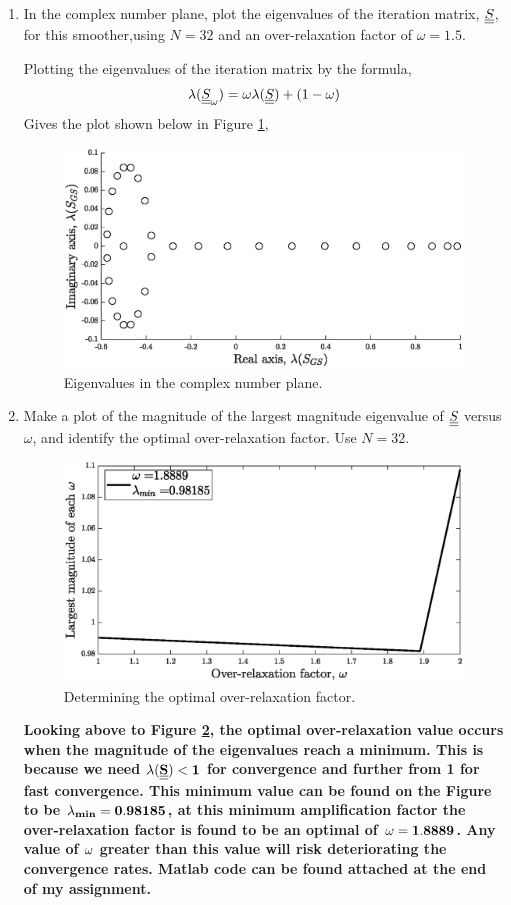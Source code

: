 \begin{enumerate}[label=\alph*., start = 1]
    \pagebreak
    \item In the complex number plane, plot the eigenvalues of the iteration matrix, $\underline{\underline{S}}$, for this smoother,using $N= 32$ and an over-relaxation factor of $\omega = 1.5$.
    
    Plotting the eigenvalues of the iteration matrix by the formula,
    \begin{equation*}
        \lambda(\underline{\underline{S}}_\omega) = \omega\lambda(\underline{\underline{S}}) + (1 - \omega)
    \end{equation*}
    Gives the plot shown below in Figure \ref{fig:q3b},
    \begin{figure}[h]
        \centering
        \includegraphics[width = 0.6\linewidth]{q3/q3_eigens.eps}
        \caption{Eigenvalues in the complex number plane.}
        \label{fig:q3b}
    \end{figure}

    
    \item Make a plot of the magnitude of the largest magnitude eigenvalue of $\underline{\underline{S}}$ versus $\omega$, and identify the optimal over-relaxation factor. Use $N= 32$.
    
    \begin{figure}[h]
        \centering
        \includegraphics[width = 0.6\linewidth]{q3/q3_omegas.eps}
        \caption{Determining the optimal over-relaxation factor.}
        \label{fig:q3-over_relaxation}
    \end{figure}

    \begin{fminipage}{0.9\linewidth}
        \textbf{Looking above to Figure \ref{fig:q3-over_relaxation}, the optimal over-relaxation value occurs when the magnitude of the eigenvalues reach a minimum. This is because we need $\bf \lambda(\underline{\underline{S}}) < 1$ for convergence and further from 1 for fast convergence. This minimum value can be found on the Figure to be $\bf \lambda_{min} = 0.98185$, at this minimum amplification factor the over-relaxation factor is found to be an optimal of $\bf \omega = 1.8889$. Any value of $\bf \omega$ greater than this value will risk deteriorating the convergence rates. Matlab code can be found attached at the end of my assignment.}
    \end{fminipage}
\end{enumerate}